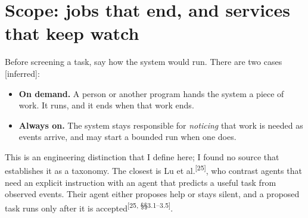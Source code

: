 \documentclass[10pt]{article}
\newcommand{\inferred}{\textsf{\small[inferred]}}
\newcommand{\p}[1]{\textsuperscript{[#1]}}
\begin{document}
\section{Scope: jobs that end, and services that keep watch}\label{sec:scope}

Before screening a task, say how the system would run. There are two cases \inferred:
\begin{itemize}
\item \textbf{On demand.} A person or another program hands the system a piece of work. It runs, and it ends when that work ends.
\item \textbf{Always on.} The system stays responsible for \emph{noticing} that work is needed as events arrive, and may start a bounded run when one does.
\end{itemize}

This is an engineering distinction that I define here; I found no source that establishes it as a taxonomy.
The closest is Lu et al.\p{25}, who contrast agents that need an explicit instruction with an agent that predicts a useful task from observed events. Their agent either proposes help or stays silent, and a proposed task runs only after it is accepted\p{25, \S\S3.1--3.5}.
\end{document}
